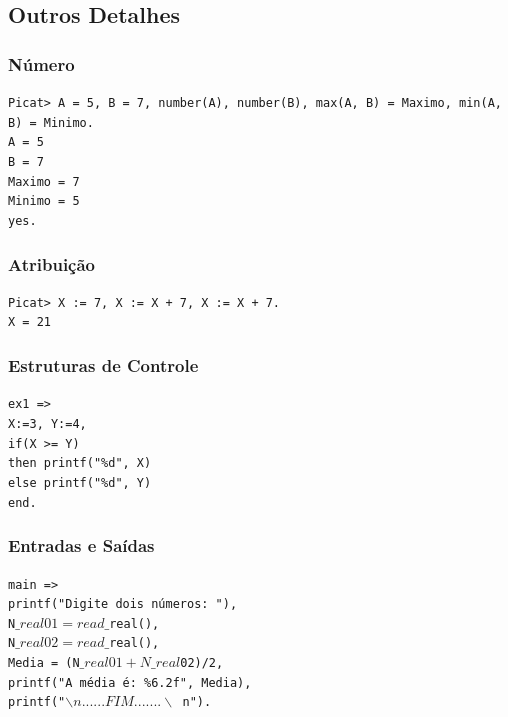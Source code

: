 \documentclass[10pt]{beamer}
\begin{document}

\subsection{Outros Detalhes}
\begin{frame}
    \frametitle{Número}
    \texttt{Picat> A = 5, B = 7, number(A), number(B),
    max(A, B) = Maximo, min(A, B) = Minimo.}\\
  
    \texttt{A = 5}\\
    \texttt{B = 7}\\
    \texttt{Maximo = 7}\\
    \texttt{Minimo = 5}\\
    \texttt{yes.}
\end{frame}






\begin{frame}
    \frametitle{Atribuição}
     \texttt{Picat> X := 7, X := X + 7, X := X + 7.}\\
     \texttt{X = 21}
\end{frame}


\begin{frame}
    \frametitle{Estruturas de Controle}
     \texttt{ex1 =>}\\
     \texttt{X:=3, Y:=4,}\\
     \texttt{if(X >= Y)}\\
     \texttt{then printf("\%d", X)}\\
     \texttt{else printf("\%d", Y)}\\
     \texttt{end.}
\end{frame}



\begin{frame}
    \frametitle{Entradas e Saídas}
    \texttt{main =>}\\
    \texttt{printf("Digite dois números: "),}\\
    \texttt{N$\_real01 = read\_$real(),}\\
    \texttt{N$\_real02 = read\_$real(),}\\
    \texttt{Media = (N$\_real01+N\_real$02)/2,}\\
    \texttt{printf("A média é: \%6.2f", Media),}\\
    \texttt{printf("$\backslash n ......FIM....... \backslash$ n").}
\end{frame}
\end{document}
